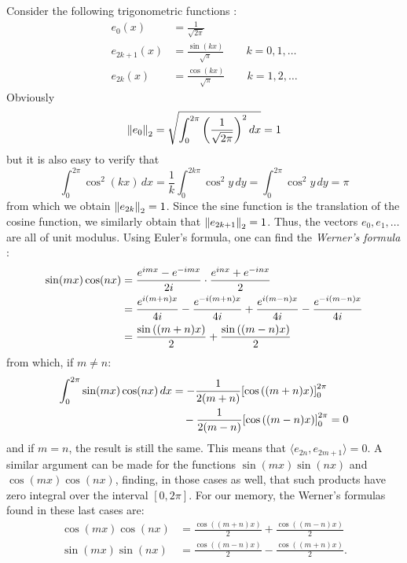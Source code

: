 Consider the following trigonometric functions%
%
:
\begin{equation}\label{eq:54741346}
\begin{aligned}
  e_0 (x) &= \frac{1}{\sqrt{2\pi}} \\
  e_{2k+1}(x) &= \frac{\sin(kx)}{\sqrt{\pi}} \qquad k=0,1,\dots\\
  e_{2k}(x) &= \frac{\cos(kx)}{\sqrt{\pi}} \qquad k=1,2,\dots
\end{aligned}
\end{equation}
Obviously
\[
  {\left\Vert e_0\right\Vert}_2=\sqrt{\int_{0}^{2\pi} {\left( \frac{1}{\sqrt{2\pi}} \right)}^2\, dx} = 1
\]
but it is also easy to verify that
\[
  \int_{0}^{2\pi} \cos^2 (kx)\, dx
  = \frac{1}{k}\int_{0}^{2k\pi} \cos^2 y\, dy
  = \int_{0}^{2\pi} \cos^2 y\, dy = \pi
\]
from which we obtain ${\left\Vert e_{2k}\right\Vert}_2 = 1$. Since the sine function is the
translation of the cosine function, we similarly obtain that
${\left\Vert e_{2k+1}\right\Vert}_2=1$. Thus, the vectors $e_0,e_1,\dots$ are all of unit modulus.
Using Euler's formula, one can find the \emph{Werner's formula}%
:
%
%
\begin{align*}
 \sin(mx)\cos(nx)
 &= \frac{e^{imx}-e^{-imx}}{2i}\cdot \frac{e^{inx}+e^{-inx}}{2}\\
 &= \frac{e^{i(m+n)x}}{4i} - \frac{e^{-i(m+n)x}}{4i} 
  + \frac{e^{i(m-n)x}}{4i} - \frac{e^{-i(m-n)x}}{4i}\\
 &= \frac{\sin{\left( (m+n)x \right)}}{2} + \frac{\sin{\left( (m-n)x \right)}}{2}
\end{align*}
from which, if $m\neq n$:
\begin{align*}
 \int_{0}^{2\pi} \sin(mx)\cos(nx)\, dx &=
 -\frac 1 {2(m+n)} {\left[ \cos{\left( (m+n)x \right)} \right]}_{0}^{2\pi} \\
  &\quad - \frac{1}{2(m-n)}{\left[ \cos{\left( (m-n)x \right)} \right]}_{0}^{2\pi} = 0
\end{align*}
and if $m=n$, the result is still the same. This means that $\langle
e_{2n},e_{2m+1}\rangle = 0$. A similar argument can be made for the functions
$\sin(mx)\sin(nx)$ and $\cos(mx)\cos(nx)$, finding, in those cases as well, that
such products have zero integral over the interval $[0,2\pi]$. For our memory,
the Werner's formulas found in these last cases are:
%
%
%
%
\begin{align*}
  \cos(mx) \cos(nx) &=  \frac{\cos((m+n)x)}{2} + \frac{\cos((m-n)x)}{2}\\
  \sin(mx) \sin(nx) &=  \frac{\cos((m-n)x)}{2} - \frac{\cos((m+n)x)}{2}.
\end{align*}

